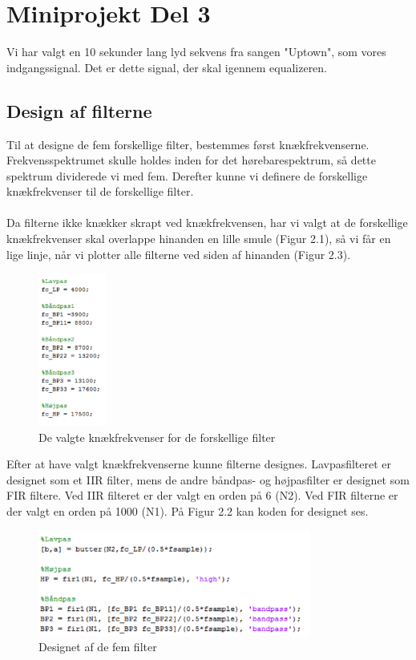 \chapter{Miniprojekt Del 3}

Vi har valgt en 10 sekunder lang lyd sekvens fra sangen "Uptown", som vores indgangssignal. 
Det er dette signal, der skal igennem equalizeren. 

\section{Design af filterne}
Til at designe de fem forskellige filter, bestemmes først knækfrekvenserne. Frekvensspektrumet skulle holdes inden for det hørebarespektrum, så dette spektrum dividerede vi med fem. Derefter kunne vi definere de forskellige knækfrekvenser til de forskellige filter. 
\\ \\
Da filterne ikke knækker skrapt ved knækfrekvensen, har vi valgt at de forskellige knækfrekvenser skal overlappe hinanden en lille smule (Figur 2.1), så vi får en lige linje, når vi plotter alle filterne ved siden af hinanden (Figur 2.3). 

\begin{figure}[H]
	\centering
	\includegraphics[width=0.2\textwidth]{Figur/Snip20151111_61}
	\caption{De valgte knækfrekvenser for de forskellige filter}
\end{figure}

Efter at have valgt knækfrekvenserne kunne filterne designes. Lavpasfilteret er designet som et IIR filter, mens de andre båndpas- og højpasfilter er designet som FIR filtere. Ved IIR filteret er der valgt en orden på 6 (N2). Ved FIR filterne er der valgt en orden på 1000 (N1). På Figur 2.2 kan koden for designet ses.  

\begin{figure}[H]
	\centering
	\includegraphics[width=0.8\textwidth]{Figur/Snip20151111_64}
	\caption{Designet af de fem filter}
\end{figure}

